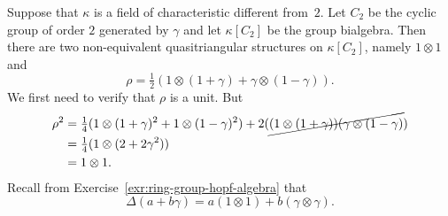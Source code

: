 \begin{xmpl}
    Suppose that $\kappa$ is a field of characteristic different from~$2$. Let $C_2$ be the cyclic group of order $2$ generated by $\gamma$ and let $\kappa[C_2]$ be the group bialgebra. Then there are two non-equivalent quasitriangular structures on $\kappa[C_2]$, namely $1\otimes1$ and
    $$
        \rho=\tfrac12(1\otimes(1+\gamma)+\gamma\otimes(1-\gamma)).
    $$
    We first need to verify that $\rho$ is a unit. But
    \begin{align*}
        \rho^2
            &= \tfrac14(1\otimes(1+\gamma)^2+1\otimes(1-\gamma)^2)
                +2(\cancel{(1\otimes(1+\gamma))(\gamma\otimes(1-\gamma)})
                \\
            &= \tfrac14(1\otimes(2+2\gamma^2))\\
            &= 1\otimes1.
    \end{align*}
    Recall from Exercise~\ref{exr:ring-group-hopf-algebra} that
    $$
        \Delta(a+b\gamma) = a(1\otimes1) + b(\gamma\otimes\gamma).
    $$
    

\end{xmpl}
